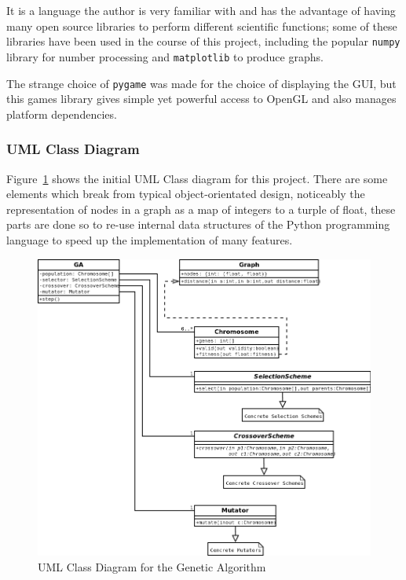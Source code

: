 \documentclass[10pt, a4paper]{article}
\begin{document}
It is a language the author is very familiar with and has the advantage of
having many open source libraries to perform different scientific functions;
some of these libraries have been used in the course of this project, including
the popular \texttt{numpy} library for number processing and 
\texttt{matplotlib} to produce graphs.

The strange choice of \texttt{pygame} was made for the choice of displaying the
GUI, but this games library gives simple yet powerful access to OpenGL and also
manages platform dependencies.

\subsubsection{UML Class Diagram}

Figure~\ref{fig:uml} shows the initial UML Class diagram for this project.
There are some elements which break from typical object-orientated design,
noticeably the representation of nodes in a graph as a map of integers to a
turple of float, these parts are done so to re-use internal data structures of
the Python programming language to speed up the implementation of many 
features.

\begin{figure}[h]
\includegraphics[width=\textwidth]{img/uml.png}
\caption{UML Class Diagram for the Genetic Algorithm}
\label{fig:uml}
\end{figure}
\end{document}
